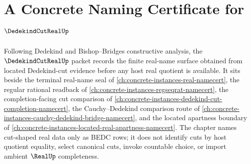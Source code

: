 \chapter{A Concrete Naming Certificate for $\DedekindCutRealUp$}
\label{ch:concrete-instances-dedekind-cut-real-namecert}

Following Dedekind and Bishop--Bridges constructive analysis, the $\DedekindCutRealUp$ packet records the finite real-name surface obtained from located Dedekind-cut evidence before any host real quotient is available. It sits beside the terminal real-name seal of \autoref{ch:concrete-instances-real-namecert}, the regular rational readback of \autoref{ch:concrete-instances-regseqrat-namecert}, the completion-facing cut comparison of \autoref{ch:concrete-instances-dedekind-cut-completion-namecert}, the Cauchy--Dedekind comparison route of \autoref{ch:concrete-instances-cauchy-dedekind-bridge-namecert}, and the located apartness boundary of \autoref{ch:concrete-instances-located-real-apartness-namecert}. The chapter names cut-shaped real data only as BEDC rows; it does not identify cuts by host quotient equality, select canonical cuts, invoke countable choice, or import ambient $\RealUp$ completeness.

